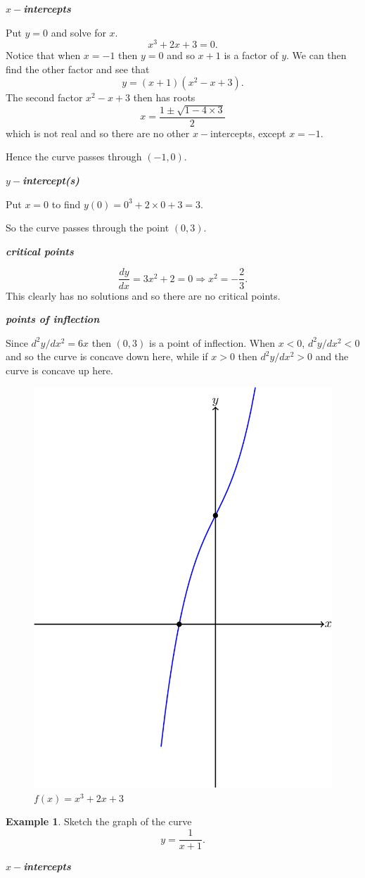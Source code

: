 \documentclass[
  11pt,
  oneside]{book}
\newcommand{\slide}{}
\theoremstyle{definition}
\theoremstyle{definition}
\newtheorem{example}{Example}[chapter]
\theoremstyle{definition}
\theoremstyle{definition}
\theoremstyle{remark}
\begin{document}
\textbf{\emph{\(x-\)intercepts}}

Put \(y=0\) and solve for \(x\).
\[
x^3+2x+3 = 0.
\]
Notice that when \(x=-1\) then \(y=0\) and so \(x+1\) is a factor of \(y\). We can then find the other factor and see that
\[
y = (x+1)(x^2-x+3).
\]
The second factor \(x^2-x+3\) then has roots
\[
x = \frac{1\pm\sqrt{1-4\times3}}{2}
\]
which is not real and so there are no other \(x-\)intercepts, except \(x=-1\).

Hence the curve passes through \((-1,0)\).

\slide

\textbf{\emph{\(y-\)intercept(s)}}

Put \(x=0\) to find \(y(0) = 0^3+2\times0+3 = 3\).

So the curve passes through the point \((0,3)\).

\textbf{\emph{critical points}}

\[
\frac{dy}{dx} = 3x^2+2 = 0 \Rightarrow x^2 = -\frac{2}{3}.
\]
This clearly has no solutions and so there are no critical points.

\textbf{\emph{points of inflection}}

Since \(d^2y/dx^2 = 6x\) then \((0,3)\) is a point of inflection. When \(x < 0\), \(d^2y/dx^2<0\) and so the curve is concave down here, while if \(x>0\) then \(d^2y/dx^2>0\) and the curve is concave up here.

\begin{figure}

{\centering \includegraphics[width=0.3\linewidth]{tikztopng-figure17} 

}

\caption{$f(x)=x^3+2x+3$}\label{fig:unnamed-chunk-26}
\end{figure}
\slide

\begin{example}
Sketch the graph of the curve
\[
y = \frac1{x+1}.
\]
\end{example}

\textbf{\emph{\(x-\)intercepts}}
\end{document}
